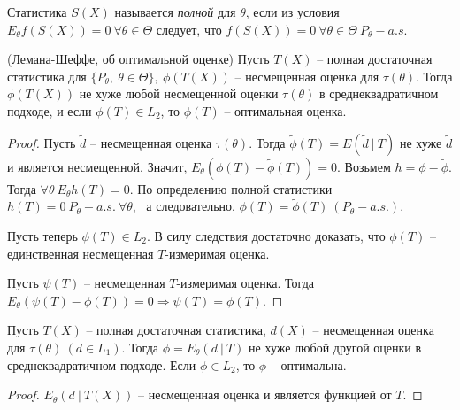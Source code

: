 \begin{definition}
    Статистика $S(X)$ называется \textit{полной} для $\theta$, если из условия $E_\theta f(S(X)) = 0\ \forall \theta \in \Theta$ следует, что $f(S(X)) = 0\ \forall \theta \in \Theta\ P_\theta-a.s.$
\end{definition}
\begin{theorem}
    (Лемана-Шеффе, об оптимальной оценке) Пусть $\displaystyle T( X)$ -- полная достаточная статистика для $\displaystyle \{P_{\theta } ,\ \theta \in \Theta \} ,\ \phi ( T( X))$ -- несмещенная оценка для $\displaystyle \tau ( \theta )$. Тогда $\displaystyle \phi ( T( X))$ не хуже любой несмещенной оценки $\displaystyle \tau ( \theta )$ в среднеквадратичном подходе, и если $\displaystyle \phi ( T) \in L_{2}$, то $\displaystyle \phi ( T)$ -- оптимальная оценка.
\end{theorem}
\begin{proof}
    Пусть $\displaystyle \tilde{d}$ -- несмещенная оценка $\displaystyle \tau ( \theta )$. Тогда $\displaystyle \tilde{\phi }( T) =E\left(\tilde{d} \ |\ T\right)$ не хуже $\displaystyle \tilde{d}$ и является несмещенной. Значит, $\displaystyle E_{\theta }\left( \phi ( T) -\tilde{\phi }( T)\right) =0$. Возьмем $\displaystyle h=\phi -\tilde{\phi }$. Тогда $\displaystyle \forall \theta \ E_{\theta } h( T) =0$. По определению полной статистики $\displaystyle h( T) =0\ P_{\theta } -a.s.\ \forall \theta $, \ а следовательно, $\displaystyle \phi ( T) =\tilde{\phi }( T) \ ( P_{\theta } -a.s.)$.
    
    Пусть теперь $\displaystyle \phi ( T) \in L_{2}$. В силу следствия достаточно доказать, что $\displaystyle \phi ( T)$ -- единственная несмещенная $\displaystyle T$-измеримая оценка.
    
    Пусть $\displaystyle \psi ( T)$ -- несмещенная $\displaystyle T$-измеримая оценка. Тогда $\displaystyle E_{\theta }( \psi ( T) -\phi ( T)) =0\Rightarrow \psi ( T) =\phi ( T)$.
\end{proof}
\begin{corollary}
    Пусть $\displaystyle T( X)$ -- полная достаточная статистика, $\displaystyle d( X)$ -- несмещенная оценка для $\displaystyle \tau ( \theta ) \ ( d\in L_{1})$. Тогда $\displaystyle \phi =E_{\theta }( d\ |\ T)$ не хуже любой другой оценки в среднеквадратичном подходе. Если $\displaystyle \phi \in L_{2}$, то $\displaystyle \phi $ -- оптимальна.
\end{corollary}
\begin{proof}
    $\displaystyle E_{\theta }( d\ |\ T( X))$ -- несмещенная оценка и является функцией от $\displaystyle T$.
\end{proof}
